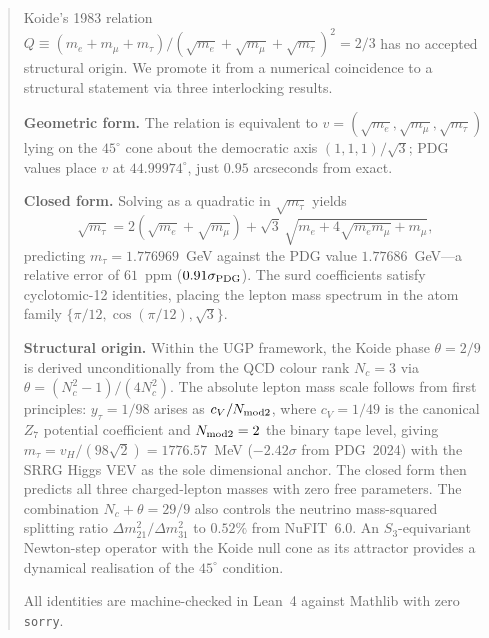 \documentclass[11pt]{article}
\theoremstyle{remark}
\begin{document}
\begin{abstract}
Koide's 1983 relation $Q \equiv (m_e + m_\mu + m_\tau)/(\sqrt{m_e} + \sqrt{m_\mu} + \sqrt{m_\tau})^2 = 2/3$ has no accepted structural origin. We promote it from a numerical coincidence to a structural statement via three interlocking results.

\textbf{Geometric form.} The relation is equivalent to $v = (\sqrt{m_e}, \sqrt{m_\mu}, \sqrt{m_\tau})$ lying on the $45^\circ$ cone about the democratic axis $(1,1,1)/\sqrt{3}$; PDG values place $v$ at $44.99974^\circ$, just $0.95$ arcseconds from exact.

\textbf{Closed form.} Solving as a quadratic in $\sqrt{m_\tau}$ yields
\[
\sqrt{m_\tau} = 2(\sqrt{m_e} + \sqrt{m_\mu}) + \sqrt{3}\,\sqrt{m_e + 4\sqrt{m_e m_\mu} + m_\mu},
\]
predicting $m_\tau = 1.776969$~GeV against the PDG value $1.77686$~GeV---a relative error of $61$~ppm ($0.91\sigma_{\rm PDG}$). The surd coefficients satisfy cyclotomic-12 identities, placing the lepton mass spectrum in the atom family $\{\pi/12, \cos(\pi/12), \sqrt{3}\}$.

\textbf{Structural origin.} Within the UGP framework, the Koide phase $\theta = 2/9$ is derived unconditionally from the QCD colour rank $N_c = 3$ via $\theta = (N_c^2 - 1)/(4N_c^2)$. The absolute lepton mass scale follows from first principles: $y_\tau = 1/98$ arises as $c_V/N_{\rm mod2}$, where $c_V = 1/49$ is the canonical $Z_7$ potential coefficient and $N_{\rm mod2} = 2$ the binary tape level, giving $m_\tau = v_H/(98\sqrt{2}) = 1776.57$~MeV ($-2.42\sigma$ from PDG~2024) with the SRRG Higgs VEV as the sole dimensional anchor. The closed form then predicts all three charged-lepton masses with zero free parameters. The combination $N_c + \theta = 29/9$ also controls the neutrino mass-squared splitting ratio $\Delta m^2_{21}/\Delta m^2_{31}$ to $0.52\%$ from NuFIT~6.0. An $S_3$-equivariant Newton-step operator with the Koide null cone as its attractor provides a dynamical realisation of the $45^\circ$ condition.

All identities are machine-checked in Lean~4 against Mathlib with zero \texttt{sorry}.
\end{abstract}

\tableofcontents

\end{document}
